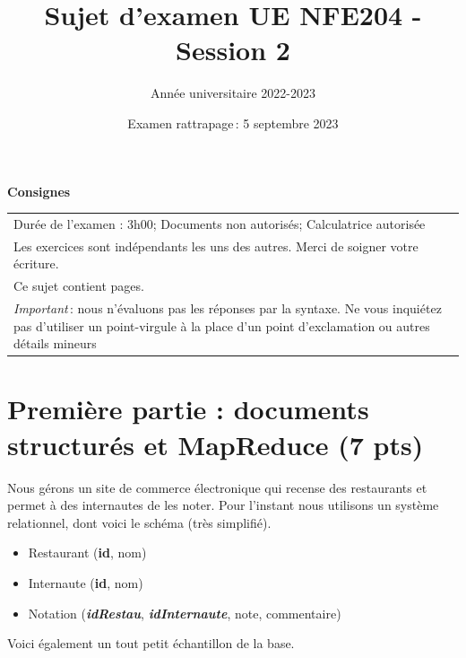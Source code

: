 \documentclass[11pt,a4paper]{article}
\begin{document}
\title{Sujet d'examen UE NFE204 - Session 2}
\author{Année universitaire 2022-2023}
\date{Examen rattrapage\,: 5 septembre 2023}

\maketitle

\begin{center}
{\bf \Large Consignes}\\
\begin{tabular}{| p{15cm} |}
\hline
Dur\'ee de l'examen : 3h00; Documents non autoris\'es;  Calculatrice autoris\'ee\\

Les exercices sont indépendants les uns des autres. Merci de soigner votre écriture.\\
Ce sujet contient \pageref{LastPage} pages.\\

\textit{Important}\,: nous n'évaluons pas les réponses par la syntaxe. Ne vous
inquiétez pas d'utiliser un point-virgule à la place d'un point d'exclamation ou
autres détails mineurs
\\
\hline
\end{tabular}
\end{center}

\section*{Première partie : documents structurés et MapReduce (7 pts)}

Nous gérons un site de commerce électronique qui recense des restaurants
et permet à des internautes de les noter. Pour l'instant nous utilisons
un système relationnel, dont voici le schéma (très simplifié).

\begin{itemize}
  \item Restaurant   (\textbf{id}, nom)
  \item Internaute (\textbf{id}, nom)
  \item Notation (\textbf{\textit{idRestau}}, \textbf{\textit{idInternaute}}, note, commentaire)
\end{itemize}

\vspace*{0.2cm}

Voici également un tout petit échantillon de la base.
\end{document}
